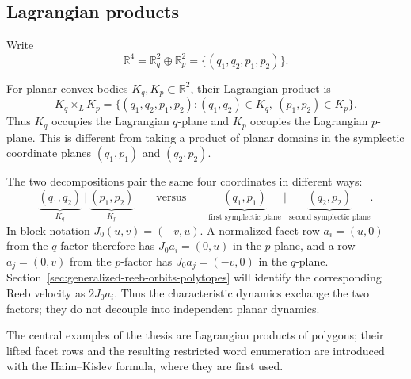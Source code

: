 \subsection{Lagrangian products}
\label{subsec:preliminaries-lagrangian-products}

Write
\[
  \mathbb R^4=\mathbb R_q^2\oplus\mathbb R_p^2
  =\{(q_1,q_2,p_1,p_2)\}.
\]
\begin{definition}
\label{def:preliminaries-lagrangian-product}
For planar convex bodies \(K_q,K_p\subset\mathbb R^2\), their Lagrangian
product is
\begin{equation}\label{eq:preliminaries-lagrangian-product}
  K_q\times_L K_p
  =\{(q_1,q_2,p_1,p_2):(q_1,q_2)\in K_q,\ (p_1,p_2)\in K_p\}.
\end{equation}
Thus \(K_q\) occupies the Lagrangian \(q\)-plane and \(K_p\) occupies the
Lagrangian \(p\)-plane.  This is different from taking a product of planar
domains in the symplectic coordinate planes \((q_1,p_1)\) and \((q_2,p_2)\).
\end{definition}

The two decompositions pair the same four coordinates in different ways:
\[
  \underbrace{(q_1,q_2)}_{K_q}\ \big|\
  \underbrace{(p_1,p_2)}_{K_p}
  \qquad\text{versus}\qquad
  \underbrace{(q_1,p_1)}_{\text{first symplectic plane}}\ \big|\
  \underbrace{(q_2,p_2)}_{\text{second symplectic plane}}.
\]
In block notation \(J_0(u,v)=(-v,u)\).  A normalized facet row
\(a_i=(u,0)\) from the \(q\)-factor therefore has \(J_0a_i=(0,u)\) in the
\(p\)-plane, and a row \(a_j=(0,v)\) from the \(p\)-factor has
\(J_0a_j=(-v,0)\) in the \(q\)-plane. Section~\ref{sec:generalized-reeb-orbits-polytopes}
will identify the corresponding Reeb velocity as \(2J_0a_i\). Thus the
characteristic dynamics exchange the two factors; they do not decouple into
independent planar dynamics.

The central examples of the thesis are Lagrangian products of polygons; their
lifted facet rows and the resulting restricted word enumeration are introduced
with the Haim--Kislev formula, where they are first used.

